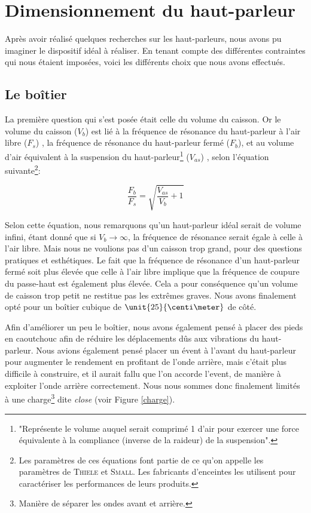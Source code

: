 



\section{Dimensionnement du haut-parleur}

Après avoir réalisé quelques recherches sur les haut-parleurs, nous avons pu imaginer le dispositif idéal
à réaliser. En tenant compte des différentes contraintes qui nous étaient imposées, voici les différents
choix que nous avons effectués.

\subsection{Le boîtier}
La première question qui s'est posée était celle du volume du caisson. Or le volume du caisson ($V_b$) est
lié à la fréquence de résonance du
haut-parleur à l'air libre ($F_s$) , la fréquence de résonance du haut-parleur fermé ($F_b$), et au volume
d'air équivalent à la suspension du haut-parleur\footnote{"Représente le volume auquel serait comprimé
\unit{1}{\meter\cubed} d'air pour exercer une force équivalente à la compliance (inverse de la raideur) de la suspension"\cite{Vas}.}
($V_{as}$) , selon l'équation suivante\footnote{Les paramètres de ces équations font partie de ce qu'on appelle les paramètres de \textsc{Thiele} et \textsc{Small}. 
Les fabricants d'enceintes les utilisent pour caractériser les performances de leurs produits.}\cite{Vas}:

$$\frac{F_b}{F_s} = \sqrt{\frac{V_{as}}{V_b} + 1}$$


Selon cette équation, nous remarquons qu'un haut-parleur idéal serait de volume infini, étant donné que si $V_b\rightarrow \infty$, la fréquence de résonance serait égale à celle à l'air libre. Mais nous ne voulions pas d'un caisson trop grand, pour des questions pratiques et esthétiques.
Le fait que la fréquence de résonance d'un haut-parleur fermé soit plus élevée que celle à l'air libre implique que
la fréquence de coupure du passe-haut est également plus élevée. Cela a pour conséquence
qu'un volume de caisson trop petit ne restitue pas les extrêmes graves. Nous avons finalement opté pour un boîtier
cubique de $\unit{25}{\centi\meter}$ de côté.

Afin d'améliorer un peu le boîtier, nous avons également pensé à placer des pieds en caoutchouc afin de
réduire les déplacements dûs aux vibrations du haut-parleur. Nous avions également pensé placer un évent à l'avant du haut-parleur
pour augmenter le rendement en profitant de l'onde arrière, mais c'était plus difficile à construire, et
il aurait fallu que l'on accorde l'event, de manière à exploiter l'onde arrière correctement. Nous nous
sommes donc finalement limités à une charge\footnote{Manière de séparer les ondes avant et arrière.} dite
\textit{close} (voir Figure \ref{charge})\cite{close}.

